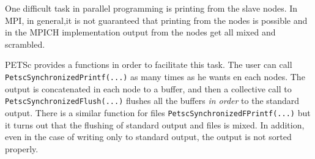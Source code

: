 
One difficult task in parallel programming is printing from the slave
nodes. In MPI, in general,it is not guaranteed that printing from the
nodes is possible and in the MPICH implementation output from the
nodes get all mixed and scrambled.

PETSc provides a functions in order to facilitate this task. 
The user can call \verb+PetscSynchronizedPrintf(...)+ as many times as
he wants en each nodes. The output is concatenated in each node to a
buffer, and then a collective call to
\verb+PetscSynchronizedFlush(...)+ flushes all the buffers \emph{in
  order} to the standard output. There is a similar function for
files \verb+PetscSynchronizedFPrintf(...)+ but it turns out that the
flushing of standard output and files is mixed. In addition, even in
the case of writing only to standard output, the output is not sorted
properly. 

